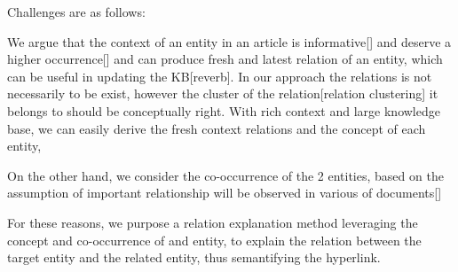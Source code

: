 Challenges are as follows: 


We argue that the context of an entity in an article is informative[] and deserve a higher occurrence[] and can produce fresh and latest relation of an entity, which can be useful in updating the KB[reverb]. In our approach the relations is not necessarily to be exist, however the cluster of the relation[relation clustering] it belongs to should be conceptually right. With rich context and large knowledge base, we can easily derive the fresh context relations and the concept of each entity,

On the other hand, we consider the co-occurrence of the 2 entities, based on the assumption of important relationship will be observed in various of documents[]

For these reasons, we purpose a relation explanation method leveraging the concept and co-occurrence of and entity, to explain the relation between the target entity and the related entity, thus semantifying the hyperlink.
